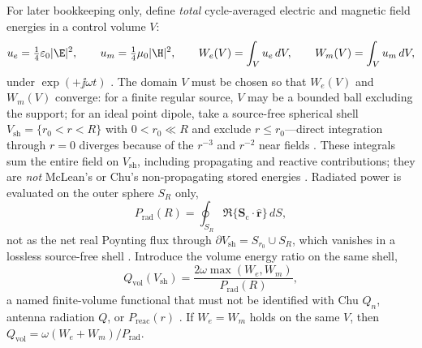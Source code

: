 For later bookkeeping only, define \emph{total} cycle-averaged electric and magnetic field energies in a control volume $V$:
\[
u_e=\tfrac14\varepsilon_0|\E|^2,\qquad u_m=\tfrac14\mu_0|\H|^2,
\qquad
W_e(V)=\int_V u_e\,dV,\qquad W_m(V)=\int_V u_m\,dV,
\]
under $\exp(+\jj\omega t)$ \cite{stratton1941,harrington2001}. The domain $V$ must be chosen so that $W_e(V)$ and $W_m(V)$ converge: for a finite regular source, $V$ may be a bounded ball excluding the support; for an ideal point dipole, take a source-free spherical shell $V_{\mathrm{sh}}=\{r_0<r<R\}$ with $0<r_0\ll R$ and exclude $r\le r_0$---direct integration through $r=0$ diverges because of the $r^{-3}$ and $r^{-2}$ near fields \cite{stratton1941,yaghjian1980dyadic}. These integrals sum the entire field on $V_{\mathrm{sh}}$, including propagating and reactive contributions; they are \emph{not} McLean's or Chu's non-propagating stored energies \cite{chu1948,mcclean1996}. Radiated power is evaluated on the outer sphere $S_R$ only,
\begin{equation}
\label{eq:ch1.qvol-prad-outer}
P_{\mathrm{rad}}(R)=\oint_{S_R}\Re\{\mathbf{S}_\mathrm{c}\cdot\hat{\mathbf{r}}\}\,dS,
\end{equation}
not as the net real Poynting flux through $\partial V_{\mathrm{sh}}=S_{r_0}\cup S_R$, which vanishes in a lossless source-free shell \cite{poynting1884,stratton1941}. Introduce the volume energy ratio on the same shell,
\begin{equation}
\label{eq:ch1.chu-q-adopted}
Q_{\mathrm{vol}}(V_{\mathrm{sh}})=\frac{2\omega\max(W_e,W_m)}{P_{\mathrm{rad}}(R)},
\end{equation}
a named finite-volume functional that must not be identified with Chu $Q_n$, antenna radiation $Q$, or $P_{\mathrm{reac}}(r)$ \cite{chu1948,mcclean1996}. If $W_e=W_m$ holds on the same $V$, then $Q_{\mathrm{vol}}=\omega(W_e+W_m)/P_{\mathrm{rad}}$.

